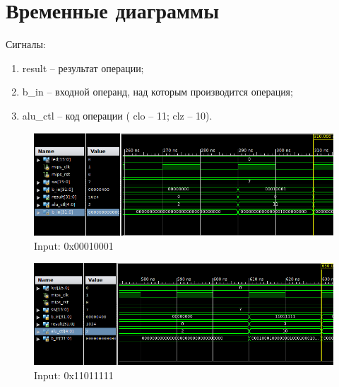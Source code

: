 \documentclass[a4paper, 10pt]{article}
\begin{document}
     \section*{Временные диаграммы}
        Сигналы:
        \begin{enumerate}
            \item result -- результат операции;
            \item b\_in  -- входной операнд, над которым производится операция;
            \item alu\_ctl -- код операции ( clo -- 11; clz -- 10).
        \end{enumerate}
        \begin{figure}[H]
            \includegraphics[scale=0.5]{../images/clo_1.png}
            \caption{Input: 0x00010001}
        \end{figure}
        \begin{figure}[H]
            \includegraphics[scale=0.5]{../images/clz_1.png}
            \caption{Input: 0x11011111}
        \end{figure}
\end{document}
